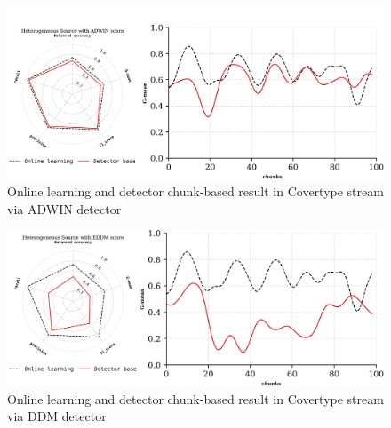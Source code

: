 \begin{figure}[!ht]
	\centering
	\includegraphics[width=1\linewidth]{6_transfer_learning/figures/exp4.png}
	\caption{Online learning and detector chunk-based result in Covertype stream via ADWIN detector}
	\label{fig:6_exp6}
\end{figure}

\begin{figure}[!ht]
	\centering
	\includegraphics[width=1\linewidth]{6_transfer_learning/figures/exp5.png}
	\caption{Online learning and detector chunk-based result in Covertype stream via DDM detector}
	\label{fig:6_exp7}
\end{figure}


